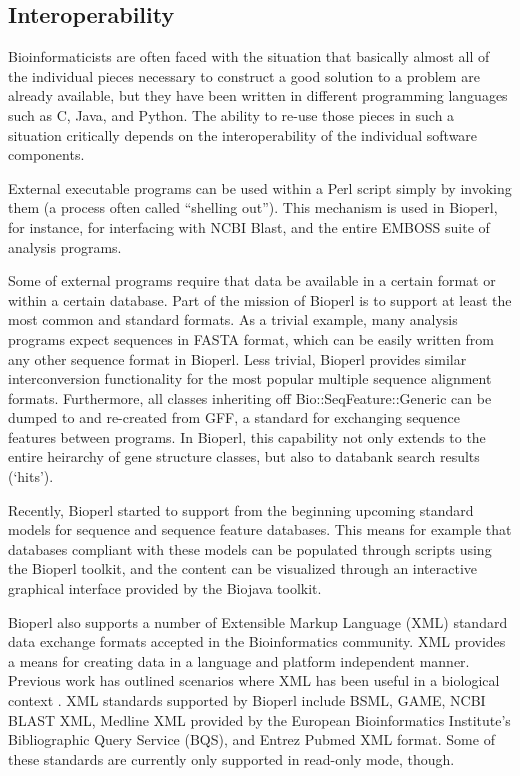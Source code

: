 \documentclass[12pt]{article}
\begin{document}
\subsection{Interoperability}

Bioinformaticists are often faced with the situation that basically
almost all of the individual pieces necessary to construct a good
solution to a problem are already available, but they have been
written in different programming languages such as C, Java, and
Python. The ability to re-use those pieces in such a situation
critically depends on the interoperability of the individual software
components.

External executable programs can be used within a Perl script simply
by invoking them (a process often called ``shelling out''). This
mechanism is used in Bioperl, for instance, for interfacing with NCBI
Blast, and the entire EMBOSS suite of analysis programs. 

Some of external programs require that data be available in a certain
format or within a certain database.  Part of the mission of Bioperl
is to support at least the most common and standard formats. As a
trivial example, many analysis programs expect sequences in FASTA
format, which can be easily written from any other sequence format in
Bioperl. Less trivial, Bioperl provides similar interconversion
functionality for the most popular multiple sequence alignment
formats. Furthermore, all classes inheriting off
Bio::SeqFeature::Generic can be dumped to and re-created from GFF, a
standard for exchanging sequence features between programs. In
Bioperl, this capability not only extends to the entire heirarchy of
gene structure classes, but also to databank search results (`hits').

Recently, Bioperl started to support from the beginning upcoming
standard models for sequence and sequence feature databases. This
means for example that databases compliant with these models can be
populated through scripts using the Bioperl toolkit, and the content
can be visualized through an interactive graphical interface provided by
the Biojava toolkit.

Bioperl also supports a number of Extensible Markup Language (XML)
standard data exchange formats accepted in the Bioinformatics
community. XML provides a means for creating data in a language and
platform independent manner.  Previous work has outlined scenarios
where XML has been useful in a biological context
\cite{xmlbioinformatics}.  XML standards supported by Bioperl include
BSML, GAME, NCBI BLAST XML, Medline XML provided by the European
Bioinformatics Institute's Bibliographic Query Service (BQS), and
Entrez Pubmed XML format. Some of these standards are currently only
supported in read-only mode, though.
\end{document}
